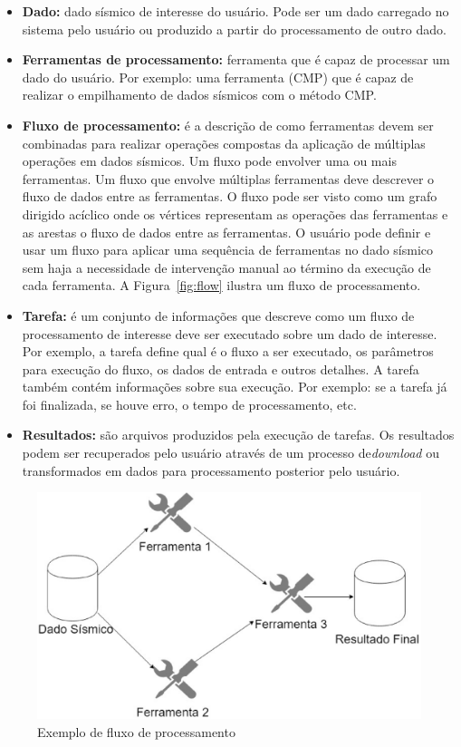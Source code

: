 \documentclass[11pt,twoside]{article}
\begin{document}
\begin{itemize}
  \item \textbf{Dado:} dado sísmico de interesse do usuário. Pode ser um dado carregado no sistema pelo usuário ou produzido a partir do processamento de outro dado. 
  \item \textbf{Ferramentas de processamento:} ferramenta que é capaz de processar um dado do usuário. Por exemplo: uma ferramenta (CMP) que é capaz de realizar o 
  empilhamento de dados sísmicos com o método CMP.
  \item \textbf{Fluxo de processamento:}  é a descrição de como ferramentas devem ser combinadas para realizar operações compostas da aplicação de múltiplas
  operações em dados sísmicos. Um fluxo pode envolver uma ou mais ferramentas. Um fluxo que envolve múltiplas ferramentas deve descrever o fluxo de
  dados entre as ferramentas. O fluxo pode ser visto como um grafo dirigido acíclico onde os vértices representam as operações das ferramentas e as arestas o
  fluxo de dados entre as ferramentas. O usuário pode definir e usar um fluxo para aplicar uma sequência de ferramentas no dado sísmico sem haja a necessidade
  de intervenção manual ao término da execução de cada ferramenta. A Figura~\ref{fig:flow} ilustra um fluxo de processamento.
  \item \textbf{Tarefa:} é um conjunto de informações que descreve como um fluxo de processamento de interesse deve ser executado sobre um 
  dado de interesse. Por exemplo, a tarefa define qual é o fluxo a ser executado, os parâmetros para execução do fluxo, os dados de entrada e 
  outros detalhes. A tarefa também contém informações sobre sua execução. Por exemplo: se a tarefa já foi finalizada, se houve erro, o tempo de processamento, etc.
  \item \textbf{Resultados:} são arquivos produzidos pela execução de tarefas. Os resultados podem ser recuperados pelo usuário através de um processo 
  de\emph{download} ou transformados em dados para processamento posterior pelo usuário. 
\end{itemize}

\begin{figure}[!h]
  \centering
  \includegraphics[scale=0.4]{flow.eps}
  \caption{Exemplo de fluxo de processamento}
  \label{fig:archtec}
\end{figure}
\end{document}
